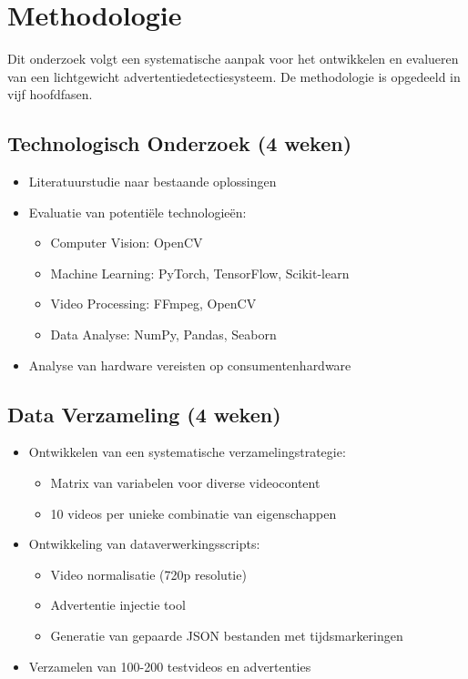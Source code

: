 \section{Methodologie}%
\label{sec:methodologie}

Dit onderzoek volgt een systematische aanpak voor het ontwikkelen en evalueren van een lichtgewicht advertentiedetectiesysteem. De methodologie is opgedeeld in vijf hoofdfasen.

\subsection{Technologisch Onderzoek (4 weken)}
\begin{itemize}
    \item Literatuurstudie naar bestaande oplossingen
    \item Evaluatie van potentiële technologieën:
    \begin{itemize}
        \item Computer Vision: OpenCV
        \item Machine Learning: PyTorch, TensorFlow, Scikit-learn
        \item Video Processing: FFmpeg, OpenCV
        \item Data Analyse: NumPy, Pandas, Seaborn
    \end{itemize}
    \item Analyse van hardware vereisten op consumentenhardware
\end{itemize}

\subsection{Data Verzameling (4 weken)}
\begin{itemize}
    \item Ontwikkelen van een systematische verzamelingstrategie:
    \begin{itemize}
        \item Matrix van variabelen voor diverse videocontent
        \item 10 videos per unieke combinatie van eigenschappen
    \end{itemize}
    \item Ontwikkeling van dataverwerkingsscripts:
    \begin{itemize}
        \item Video normalisatie (720p resolutie)
        \item Advertentie injectie tool
        \item Generatie van gepaarde JSON bestanden met tijdsmarkeringen
    \end{itemize}
    \item Verzamelen van 100-200 testvideos en advertenties
\end{itemize}

